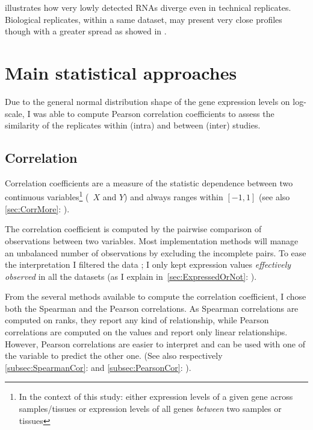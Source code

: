  illustrates how very lowly detected \glspl{RNA}
diverge even in technical replicates.
Biological replicates, within a same dataset,
may present very close profiles though with a greater spread
as showed in .


\section{Main statistical approaches}

Due to the general normal distribution shape of the gene expression levels
on log-scale,
I was able to compute Pearson correlation coefficients
to assess the similarity of the replicates
within (intra) and between (inter) studies.

\subsection{Correlation}

Correlation coefficients are a measure of the statistic dependence between two
continuous variables\footnote{In the context of this study: either expression
levels of a given gene across samples/tissues or expression levels of all genes
\emph{between} two samples or tissues} (\eg\
$X$ and $Y$) and always ranges within $[-1,1]$ (see also
\cref{sec:CorrMore}: ).

The correlation coefficient is computed by the pairwise comparison of observations
between two variables. Most implementation methods
will manage an unbalanced number of observations by excluding the incomplete pairs.
To ease the interpretation I filtered the data \latin{a priori};
I only kept expression values \emph{effectively observed}
in all the datasets
(as I explain in~\cref{sec:ExpressedOrNot}: ).

From the several methods available to compute the correlation coefficient,
I chose both the Spearman and the Pearson correlations.
As Spearman correlations are computed on ranks,
they report any kind of relationship,
while Pearson correlations are computed on the values
and report only linear relationships.
However, Pearson correlations are easier to interpret
and can be used with one of the variable to predict the other one.
(See also respectively \cref{subsec:SpearmanCor}:  and
\cref{subsec:PearsonCor}: \nameref{subsec:PearsonCor}).

